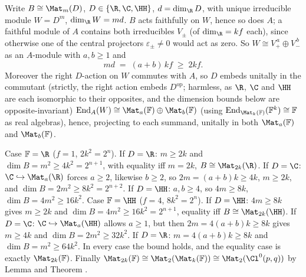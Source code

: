 Write $B \cong \Mat_m(D)$, $D \in \{\R, \C, \HH\}$, $d = \dim_\R D$, with unique irreducible module $W = D^m$, $\dim_\R W = md$. $B$ acts faithfully on $W$, hence so does $A$; a faithful module of $A$ contains both irreducibles $V_\pm$ (of $\dim_\R = kf$ each), since otherwise one of the central projectors $\varepsilon_\pm \neq 0$ would act as zero. So $W \cong V_+^{\,a} \oplus V_-^{\,b}$ as an $A$-module with $a, b \geq 1$ and
\[
md \;=\; (a + b)\,k f \;\geq\; 2kf .
\]
Moreover the right $D$-action on $W$ commutes with $A$, so $D$ embeds unitally in the commutant (strictly, the right action embeds $D^{\mathrm{op}}$; harmless, as $\R$, $\C$ and $\HH$ are each isomorphic to their opposites, and the dimension bounds below are opposite-invariant) $\mathrm{End}_A(W) \cong \Mat_a(\mathbb{F}) \oplus \Mat_b(\mathbb{F})$ (using $\mathrm{End}_{\Mat_k(\mathbb{F})}(\mathbb{F}^k) \cong \mathbb{F}$ as real algebras), hence, projecting to each summand, unitally in both $\Mat_a(\mathbb{F})$ and $\Mat_b(\mathbb{F})$.

Case $\mathbb{F} = \R$ ($f = 1$, $2k^2 = 2^n$). If $D = \R$: $m \geq 2k$ and $\dim B = m^2 \geq 4k^2 = 2^{n+1}$, with equality iff $m = 2k$, $B \cong \Mat_{2k}(\R)$. If $D = \C$: $\C \hookrightarrow \Mat_a(\R)$ forces $a \geq 2$, likewise $b \geq 2$, so $2m = (a+b)k \geq 4k$, $m \geq 2k$, and $\dim B = 2m^2 \geq 8k^2 = 2^{n+2}$. If $D = \HH$: $a, b \geq 4$, so $4m \geq 8k$, $\dim B = 4m^2 \geq 16k^2$. Case $\mathbb{F} = \HH$ ($f = 4$, $8k^2 = 2^n$). If $D = \HH$: $4m \geq 8k$ gives $m \geq 2k$ and $\dim B = 4m^2 \geq 16k^2 = 2^{n+1}$, equality iff $B \cong \Mat_{2k}(\HH)$. If $D = \C$: $\C \hookrightarrow \Mat_a(\HH)$ allows $a \geq 1$, but then $2m = 4(a+b)k \geq 8k$ gives $m \geq 4k$ and $\dim B = 2m^2 \geq 32k^2$. If $D = \R$: $m = 4(a+b)k \geq 8k$ and $\dim B = m^2 \geq 64k^2$. In every case the bound holds, and the equality case is exactly $\Mat_{2k}(\mathbb{F})$. Finally $\Mat_{2k}(\mathbb{F}) \cong \Mat_2(\Mat_k(\mathbb{F})) \cong \Mat_2(\Cl^0(p,q))$ by Lemma  and Theorem .

